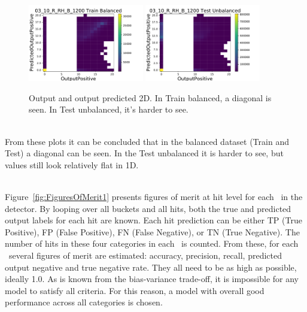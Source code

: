 \begin{figure}[t]
\centering
\includegraphics[width=0.45\textwidth]{plots/plot_04_1_overlay_histo2D_OutputPositive_PredictedOutputPositive_03_10_R_RH_B_1200_Train.pdf}
\includegraphics[width=0.45\textwidth]{plots/plot_04_1_overlay_histo2D_OutputPositive_PredictedOutputPositive_03_10_R_RH_B_1200_Test.pdf}\\
\caption{Output and output predicted 2D. In Train balanced, a diagonal is seen. In Test unbalanced, it's harder to see.}
\label{fig:OutputOutputPredicted2D}
\end{figure}

\ \\From these plots it can be concluded that in the balanced dataset (Train and Test) a diagonal can be seen. In the Test unbalanced it is harder to see, but values still look relatively flat in 1D. 

\ \\Figure~\ref{fig:FiguresOfMerit1} presents figures of merit at hit level for each \volumeID~in the detector. By looping over all buckets and all hits, both the true and predicted output labels for each hit are known. Each hit prediction can be either TP (True Positive), FP (False Positive), FN (False Negative), or TN (True Negative). The number of hits in these four categories in each \volumeID~is counted. From these, for each \volumeID~several figures of merit are estimated: accuracy, precision, recall, predicted output negative and true negative rate. They all need to be as high as possible, ideally 1.0. As is known from the bias-variance trade-off, it is impossible for any model to satisfy all criteria. For this reason, a model with overall good performance across all categories is chosen.

